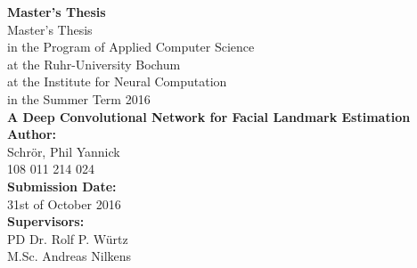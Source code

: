 \documentclass[11pt, a4paper]{article}
\begin{document}
\thispagestyle{empty}

\setlength{\hoffset}{-0.5cm} %

\lstset{
  basicstyle=\small,           %
  breaklines=true,             %
  captionpos=b,                %
  frame=single,                %
  keepspaces=true,             %
  numbers=right,               %
  showspaces=false,            %
  stepnumber=1,                %
  tabsize=4,                   %
  xleftmargin=0.14cm		   %
}

\begin{titlepage}
    \begin{center}
    \LARGE \textbf{Master's Thesis}\\
    \vspace{3cm}
    \normalsize
    Master's Thesis\\
    in the Program of Applied Computer Science\\
    at the Ruhr-University Bochum\\
    at the Institute for Neural Computation\\
    in the Summer Term 2016\\
    \vspace{3cm}
    \LARGE \textbf{A Deep Convolutional Network for Facial Landmark Estimation} \\
    \vspace{3cm}
    \normalsize
    \textbf{Author:}\\
    Schrör, Phil Yannick\\
    108 011 214 024\\
    \vspace{2cm}
    \textbf{Submission Date:}\\
    31st of October 2016\\
    \vspace{2cm}
    \textbf{Supervisors:}\\
    PD Dr. Rolf P. Würtz\\
    M.Sc. Andreas Nilkens
    \end{center}
\end{titlepage}
\end{document}
